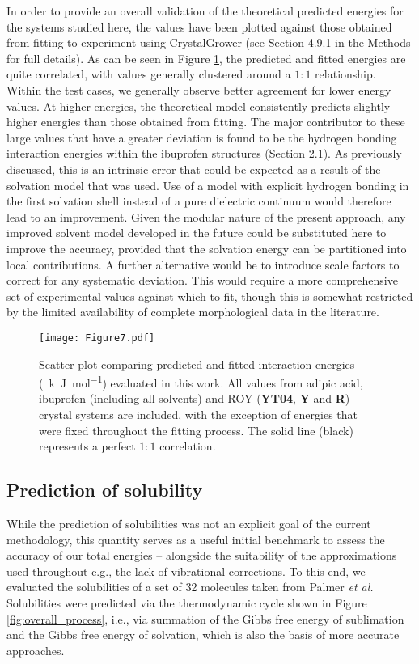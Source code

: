 \documentclass[twoside,twocolumn,9pt]{article}
\begin{document}
In order to provide an overall validation of the theoretical predicted energies for the systems studied here, 
the values have been plotted against those obtained from fitting to experiment using CrystalGrower (see Section 4.9.1 in the Methods for full details). As can be seen in  Figure \ref{fig:compare_full}, the predicted and fitted energies are quite correlated, with values generally clustered around a $1:1$ relationship.
Within the test cases, we generally observe better agreement for lower energy values. At higher energies, the theoretical model consistently predicts slightly higher energies than those obtained from fitting. The major contributor to these large values that have a greater deviation is found to be the hydrogen bonding interaction energies within the ibuprofen structures (Section 2.1). As previously discussed, this is an intrinsic error that could be expected as a result of the solvation model that was used. Use of a model with explicit hydrogen bonding in the first solvation shell instead of a pure dielectric continuum would therefore lead to an improvement. Given the modular nature of the present approach, any improved solvent model developed in the future could be substituted here to improve the accuracy, provided that the solvation energy can be partitioned into local contributions. A further alternative would be to introduce scale factors to correct for any systematic deviation. This would require a more comprehensive set of experimental values against which to fit, though this is somewhat restricted by the limited availability of complete morphological data in the literature.


\begin{figure}
\centering
  \texttt{[image: Figure7.pdf]}
\caption{Scatter plot comparing predicted and fitted interaction energies (\qty{}{k.J.mol^{-1}}) evaluated in this work. 
    All values from adipic acid, ibuprofen (including all solvents) and ROY (\textbf{YT04}, \textbf{Y} and \textbf{R}) crystal systems are included,
    with the exception of energies that were fixed throughout the fitting process. The solid line (black) represents a perfect $1:1$ correlation.}
\label{fig:compare_full}
\end{figure}

\subsection{Prediction of solubility}
While the prediction of solubilities was not an explicit goal of the current methodology, this quantity serves as a useful initial benchmark to assess the accuracy of our total energies – alongside the suitability of the approximations used throughout e.g., the lack of vibrational corrections. 
To this end, we evaluated the solubilities of a set of 32 molecules taken from Palmer \emph{et al.}\cite{Palmer2008}
Solubilities were predicted via the thermodynamic cycle shown in Figure \ref{fig:overall_process}, i.e., via summation of the Gibbs free energy of sublimation and the Gibbs free energy of solvation, which is also the basis of more accurate approaches.\cite{Fowles2021}
\end{document}
